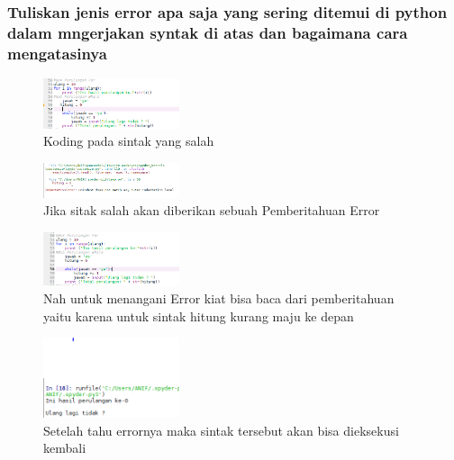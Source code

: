 \subsubsection{Tuliskan jenis error apa saja yang sering ditemui di python dalam mngerjakan syntak di atas dan bagaimana cara mengatasinya}
\begin{figure}[H]
		\includegraphics[width=4cm]{figures/1184065/SintakError.PNG}
		\centering
		\caption{Koding pada sintak yang salah}
\end{figure}
\begin{figure}[H]
		\includegraphics[width=4cm]{figures/1184065/SintakPemberitahuanError.PNG}
		\centering
		\caption{Jika sitak salah akan diberikan sebuah Pemberitahuan Error}
\end{figure}
\begin{figure}[H]
		\includegraphics[width=4cm]{figures/1184065/SintakErrorMenangani.PNG}
		\centering
		\caption{Nah untuk menangani Error kiat bisa baca dari pemberitahuan yaitu karena untuk sintak hitung kurang maju ke depan}
\end{figure}
\begin{figure}[H]
		\includegraphics[width=4cm]{figures/1184065/SintakHasilMenanganiError.PNG}
		\centering
		\caption{Setelah tahu errornya maka sintak tersebut akan bisa dieksekusi kembali}
\end{figure}
